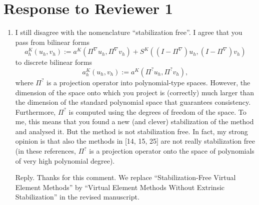\documentclass[10pt]{amsart}
\theoremstyle{definition}
\theoremstyle{remark}
\begin{document}
\section{Response to Reviewer 1}
\begin{enumerate}[1.]

\item \textsf{I still disagree with the nomenclature ``stabilization free''. I agree that you pass from bilinear forms
\begin{equation}\label{eq1}
a_h^K(u_h, v_h):= a^K(\Pi^{\nabla}u_h, \Pi^{\nabla}v_h) + S^K((I-\Pi^{\nabla})u_h, (I-\Pi^{\nabla})v_h)
\end{equation}
to discrete bilinear forms
$$
a_h^K(u_h, v_h):= a^K(\Pi^{?}u_h, \Pi^{?}v_h),
$$
where $\Pi^{?}$ is a projection operator into polynomial-type spaces. \vskip0.1cm
\noindent However, the dimension of the space onto which you project is (correctly) much larger than the dimension of the standard polynomial space that guarantees consistency.  \vskip0.1cm
\noindent 
Furthermore, $\Pi^{?}$ is computed using the degrees of freedom of the space. To me, this means that you found a new (and clever) stabilization of the method and analysed it. But the method is not stabilization free.  \vskip0.1cm
\noindent 
In fact, my strong opinion is that also the methods in [14, 15, 25] are not really stabilization free (in these references, $\Pi^{?}$ is a projection operator onto the space of polynomials of very high polynomial degree).
}

\smallskip \noindent \textcolor[rgb]{1.00,0.00,0.00}{Reply.}
Thanks for this comment. We replace ``Stabilization-Free Virtual Element Methods'' by 
``Virtual Element Methods Without Extrinsic Stabilization'' in the revised manuscript.


\medskip


\end{enumerate}
\end{document}
